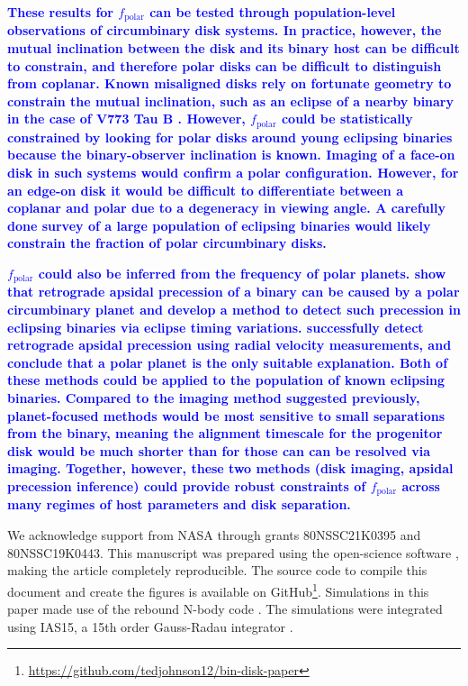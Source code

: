 \documentclass[twocolumn,linenumbers]{aastex631}
\newcommand\ghurl[0]{\url{https://github.com/tedjohnson12/bin-disk-paper}}
\newcommand{\RR}[1]{\textcolor{blue}{\bf#1}} %
\begin{document}
\RR{
These results for $f_\text{polar}$ can be tested through population-level observations of circumbinary disk systems. In practice, however, the mutual inclination between the disk and its binary host can be difficult to constrain, and therefore polar disks can be difficult to distinguish from coplanar. Known misaligned disks rely on fortunate geometry to constrain the mutual inclination, such as an eclipse of a nearby binary in the case of V773 Tau B \citep{kenworthy2022}. However, $f_\text{polar}$ could be statistically constrained by looking for polar disks around young eclipsing binaries because the binary-observer inclination is known. Imaging of a face-on disk in such systems would confirm a polar configuration. However, for an edge-on disk it would be difficult to differentiate between a coplanar and polar due to a degeneracy in viewing angle. A carefully done survey of a large population of eclipsing binaries \citep[e.g., those found by the Kepler Mission,][]{kirk2016} would likely constrain the fraction of polar circumbinary disks.}

\RR{
$f_\text{polar}$ could also be inferred from the frequency of polar planets. \citet{zhang2019} show that retrograde apsidal precession of a binary can be caused by a polar circumbinary planet and develop a method to detect such precession in eclipsing binaries via eclipse timing variations. \citet{baycroft2025} successfully detect retrograde apsidal precession using radial velocity measurements, and conclude that a polar planet is the only suitable explanation. Both of these methods could be applied to the population of known eclipsing binaries. Compared to the imaging method suggested previously, planet-focused methods would be most sensitive to small separations from the binary, meaning the alignment timescale for the progenitor disk would be much shorter than for those can can be resolved via imaging. Together, however, these two methods (disk imaging, apsidal precession inference) could provide robust constraints of $f_\text{polar}$ across many regimes of host parameters and disk separation.
}


\begin{acknowledgements}
\label{sec:ack}

We acknowledge support from NASA through grants 80NSSC21K0395 and 80NSSC19K0443. This manuscript was prepared using the open-science software \href{https://show-your.work/en/latest/intro/}{\showyourwork} \citep{luger2021}, making the article completely
reproducible. The source code to compile this document and create the figures is available on GitHub\footnote{\ghurl}.
Simulations in this paper made use of the {\sc rebound} N-body code \citep{rebound}.
The simulations were integrated using IAS15, a 15th order Gauss-Radau integrator \citep{reboundias15}. 

\end{acknowledgements}
\end{document}
